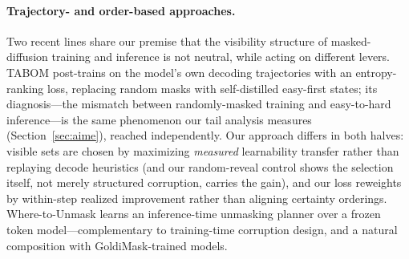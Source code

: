 \documentclass{article} %
\begin{document}

\paragraph{Trajectory- and order-based approaches.} Two recent lines share our premise that the visibility structure of masked-diffusion training and inference is not neutral, while acting on different levers. TABOM \citep{chen2026tabom} post-trains on the model's own decoding trajectories with an entropy-ranking loss, replacing random masks with self-distilled easy-first states; its diagnosis---the mismatch between randomly-masked training and easy-to-hard inference---is the same phenomenon our tail analysis measures (Section~\ref{sec:aime}), reached independently. Our approach differs in both halves: visible sets are chosen by maximizing \emph{measured} learnability transfer rather than replaying decode heuristics (and our random-reveal control shows the selection itself, not merely structured corruption, carries the gain), and our loss reweights by within-step realized improvement rather than aligning certainty orderings. Where-to-Unmask \citep{asano2026unmask} learns an inference-time unmasking planner over a frozen token model---complementary to training-time corruption design, and a natural composition with GoldiMask-trained models.
\end{document}
